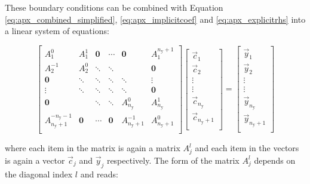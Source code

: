\noindent These boundary conditions can be combined with Equation
\ref{eq:apx_combined_simplified}, \ref{eq:apx_implicitcoef} and
\ref{eq:apx_explicitrhs} into a linear system of equations:

\begin{equation}
  \label{eq:apx_system}
  \left[
    \begin{array}{cccccc}
      A^0_1      & A^{1}_1    & \textbf{0} & \cdots       & \textbf{0}    & A^{n_{\mathrm{y}}+1}_1 \\
      A^{-1}_2   & A^0_2      & \ddots     & \ddots       &               & \textbf{0} \\
      \textbf{0} & \ddots     & \ddots     & \ddots       & \ddots        & \vdots     \\
      \vdots     & \ddots     & \ddots     & \ddots       & \ddots        & \textbf{0} \\
      \textbf{0} &            & \ddots     & \ddots       & A^0_{n_{\mathrm{y}}}      & A^1_{n_{\mathrm{y}}}   \\
      A^{-n_{\mathrm{y}}-1}_{n_{\mathrm{y}}+1} & \textbf{0} & \cdots     & \textbf{0}   & A^{-1}_{n_{\mathrm{y}}+1} & A^0_{n_{\mathrm{y}}+1} \\
    \end{array}
  \right] \left[
    \begin{array}{c}
      \vec{c}_1 \\ \vec{c}_2 \\ \vdots \\ \vdots \\ \vec{c}_{n_{\mathrm{y}}} \\ \vec{c}_{n_{\mathrm{y}}+1} \\
    \end{array} 
  \right] = \left[ 
    \begin{array}{c}
      \vec{y}_1 \\ \vec{y}_2 \\ \vdots \\ \vdots \\ \vec{y}_{n_{\mathrm{y}}} \\ \vec{y}_{n_{\mathrm{y}}+1} \\
    \end{array} 
  \right]
\end{equation}
    
\noindent where each item in the matrix is again a matrix $A^l_j$ and
each item in the vectors is again a vector $\vec{c}_j$ and
$\vec{y}_j$ respectively. The form of the matrix $A^l_j$ depends on
the diagonal index $l$ and reads:

